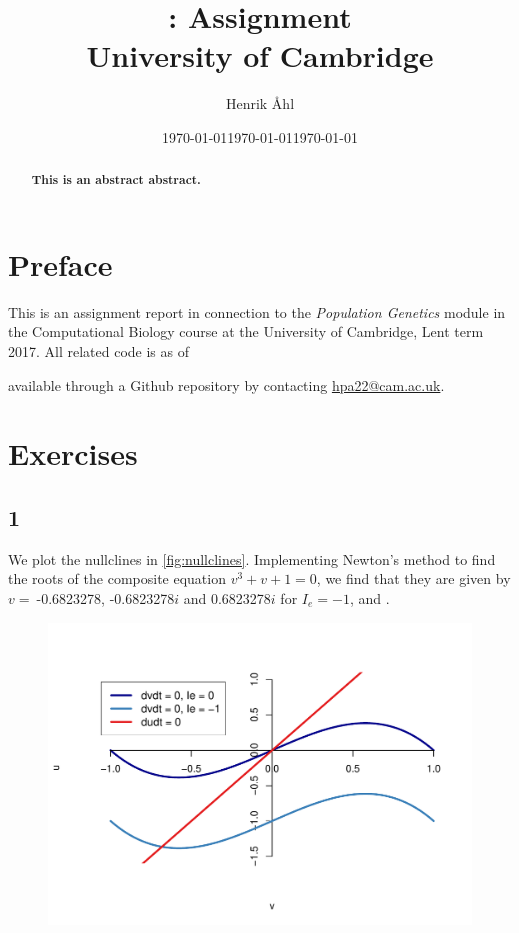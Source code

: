 \documentclass[10pt]{article}\usepackage[]{graphicx}\usepackage[]{color}
\title{
  \bf \course: Assignment \ass \\[1em]
  \small{University of Cambridge}
}
\author{Henrik Åhl}
\date{\today}
\makeatletter
\def\maxwidth{ %
  \ifdim\Gin@nat@width>\linewidth
    \linewidth
  \else
    \Gin@nat@width
  \fi
}
\theoremstyle{plain}
\newcommand{\course}{Population Genetics}
\newcommand{\term}{Lent term 2017}
\makeatother
\begin{document}
\date{\today}
\maketitle
\setcounter{page}{1}


\maketitle
\begin{abstract}
{\bf 
  This is an abstract abstract.
}
\end{abstract}

\begin{multicols*}{2}
\section*{Preface}
This is an assignment report in connection to the \textit{\course}
module in the Computational Biology course at the University of Cambridge,
\term. All related code is as of \date{\today} available through a
Github repository by contacting \href{mailto:hpa22@cam.ac.uk}{hpa22@cam.ac.uk}.
\section*{Exercises}
\subsection*{1}


We plot the nullclines in \cref{fig:nullclines}. Implementing Newton's method to find the roots of the composite equation $v^3 + v + 1 = 0$, we find that they are given by $v =~$-0.6823278, -0.6823278$i$ and 0.6823278$i$ for $I_e = -1$, and .
\begin{Schunk}
\begin{figure}[H]

{\centering \includegraphics[width=\maxwidth]{../figures/twocolumn-nullclines-1} 

}
\end{figure}
\end{Schunk}
\end{multicols*}
\end{document}
